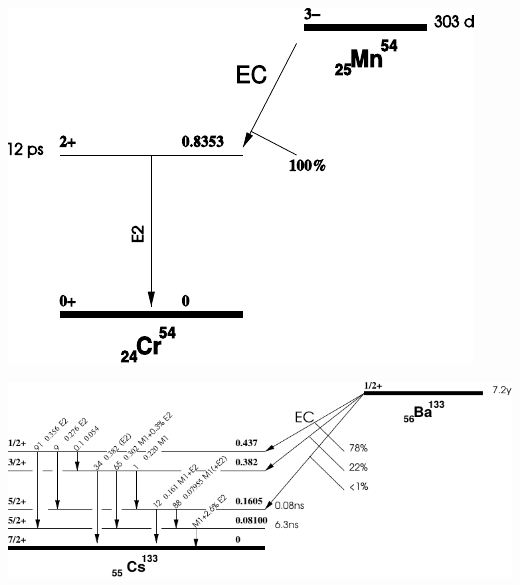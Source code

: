 \begin{multicols}{2}
\begin{center}
\begin{adjustbox}{max width=\linewidth, keepaspectratio}
        \end{adjustbox}
        \label{fig:137CsDecayScheme}
    \end{center}
\endminipage
%
\vspace{10mm}
%
\minipage{\linewidth}
    \begin{center}
        \captionsetup{type=figure}
        \begin{adjustbox}{max width=\linewidth, keepaspectratio}
            \includegraphics[]{pdf/DecayScheme54Mn}
        \end{adjustbox}
        \label{fig:54MnDecayScheme}
    \end{center}
\endminipage
%
\vspace{10mm}
%
\minipage{\linewidth}
    \begin{center}
        \captionsetup{type=figure}
        \begin{adjustbox}{max width=\linewidth, keepaspectratio}
            \includegraphics[]{pdf/DecayScheme133Ba}
        \end{adjustbox}

\end{center}
\end{multicols}
